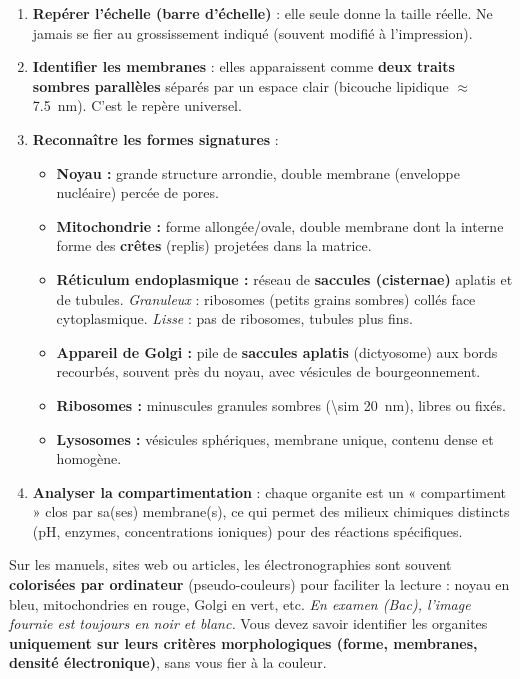 \documentclass[11pt]{article}
\begin{document}
\begin{methode}
\begin{enumerate}
    \item \textbf{Repérer l'échelle (barre d'échelle)} : elle seule donne la taille réelle. Ne jamais se fier au grossissement indiqué (souvent modifié à l'impression).
    \item \textbf{Identifier les membranes} : elles apparaissent comme \textbf{deux traits sombres parallèles} séparés par un espace clair (bicouche lipidique $\approx$ \SI{7,5}{\nano\meter}). C'est le repère universel.
    \item \textbf{Reconnaître les formes signatures} :
    \begin{itemize}
        \item \textbf{Noyau :} grande structure arrondie, double membrane (enveloppe nucléaire) percée de pores.
        \item \textbf{Mitochondrie :} forme allongée/ovale, double membrane dont la interne forme des \textbf{crêtes} (replis) projetées dans la matrice.
        \item \textbf{Réticulum endoplasmique :} réseau de \textbf{saccules (cisternae)} aplatis et de tubules. \emph{Granuleux} : ribosomes (petits grains sombres) collés face cytoplasmique. \emph{Lisse} : pas de ribosomes, tubules plus fins.
        \item \textbf{Appareil de Golgi :} pile de \textbf{saccules aplatis} (dictyosome) aux bords recourbés, souvent près du noyau, avec vésicules de bourgeonnement.
        \item \textbf{Ribosomes :} minuscules granules sombres (\SI{\sim 20}{\nano\meter}), libres ou fixés.
        \item \textbf{Lysosomes :} vésicules sphériques, membrane unique, contenu dense et homogène.
    \end{itemize}
    \item \textbf{Analyser la compartimentation} : chaque organite est un « compartiment » clos par sa(ses) membrane(s), ce qui permet des milieux chimiques distincts (pH, enzymes, concentrations ioniques) pour des réactions spécifiques.
\end{enumerate}
\end{methode}

\begin{attention}
Sur les manuels, sites web ou articles, les électronographies sont souvent \textbf{colorisées par ordinateur} (pseudo-couleurs) pour faciliter la lecture : noyau en bleu, mitochondries en rouge, Golgi en vert, etc.
\emph{En examen (Bac), l'image fournie est toujours en noir et blanc.} Vous devez savoir identifier les organites \textbf{uniquement sur leurs critères morphologiques (forme, membranes, densité électronique)}, sans vous fier à la couleur.
\end{attention}
\end{document}
